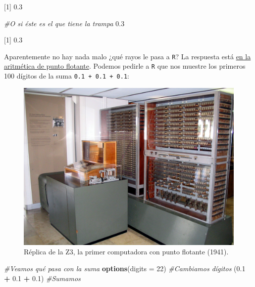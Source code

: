 \documentclass[
]{book}
\newenvironment{Shaded}{\begin{snugshade}}{\end{snugshade}}
\newcommand{\CommentTok}[1]{\textcolor[rgb]{0.56,0.35,0.01}{\textit{#1}}}
\newcommand{\DataTypeTok}[1]{\textcolor[rgb]{0.13,0.29,0.53}{#1}}
\newcommand{\DecValTok}[1]{\textcolor[rgb]{0.00,0.00,0.81}{#1}}
\newcommand{\FloatTok}[1]{\textcolor[rgb]{0.00,0.00,0.81}{#1}}
\newcommand{\KeywordTok}[1]{\textcolor[rgb]{0.13,0.29,0.53}{\textbf{#1}}}
\newcommand{\NormalTok}[1]{#1}
\newcommand{\OperatorTok}[1]{\textcolor[rgb]{0.81,0.36,0.00}{\textbf{#1}}}
\newcommand{\StringTok}[1]{\textcolor[rgb]{0.31,0.60,0.02}{#1}}
\begin{document}
{[}1{]} 0.3

\begin{Shaded}
\begin{Highlighting}[]
\CommentTok{#O si éste es el que tiene la trampa}
\FloatTok{0.3}
\end{Highlighting}
\end{Shaded}

{[}1{]} 0.3

Aparentemente no hay nada malo ¿qué rayos le pasa a \texttt{R}? La respuesta está \href{https://www.youtube.com/watch?v=PZRI1IfStY0}{en la aritmética de punto flotante}. Podemos pedirle a \texttt{R} que nos muestre los primeros 100 dígitos de la suma \texttt{0.1\ +\ 0.1\ +\ 0.1}:

\begin{figure}

{\centering \includegraphics[width=22.22in]{images/Z3_Deutsches_Museum} 

}

\caption{Réplica de la Z3, la primer computadora con punto flotante (1941).}\label{fig:unnamed-chunk-75}
\end{figure}

\begin{Shaded}
\begin{Highlighting}[]
\CommentTok{#Veamos qué pasa con la suma}
\KeywordTok{options}\NormalTok{(}\DataTypeTok{digits =} \DecValTok{22}\NormalTok{) }\CommentTok{#Cambiamos dígitos}
\NormalTok{(}\FloatTok{0.1} \OperatorTok{+}\StringTok{ }\FloatTok{0.1} \OperatorTok{+}\StringTok{ }\FloatTok{0.1}\NormalTok{)    }\CommentTok{#Sumamos}
\end{Highlighting}
\end{Shaded}
\end{document}
